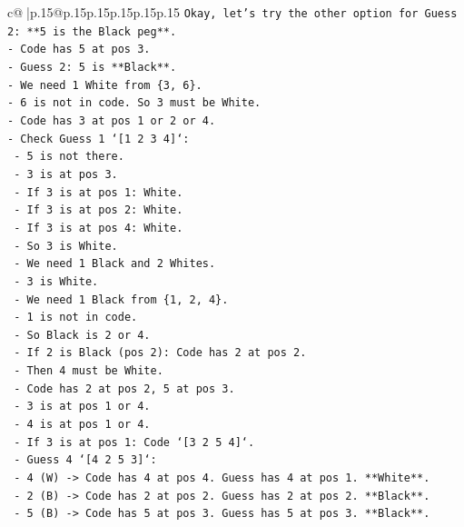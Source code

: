 \documentclass{article}
\begin{document}
{\begin{supertabular}{c@{$\;$}|p{.15\linewidth}@{}p{.15\linewidth}p{.15\linewidth}p{.15\linewidth}p{.15\linewidth}p{.15\linewidth}}
{{{\texttt{Okay, let's try the other option for Guess 2: **5 is the Black peg**.} \\
\texttt{{-}   Code has 5 at pos 3.} \\
\texttt{{-}   Guess 2: 5 is **Black**.} \\
\texttt{{-}   We need 1 White from \{3, 6\}.} \\
\texttt{{-}   6 is not in code. So 3 must be White.} \\
\texttt{{-}   Code has 3 at pos 1 or 2 or 4.} \\
\texttt{{-}   Check Guess 1 `{[}1 2 3 4{]}`:} \\
\texttt{    {-}   5 is not there.} \\
\texttt{    {-}   3 is at pos 3.} \\
\texttt{    {-}   If 3 is at pos 1: White.} \\
\texttt{    {-}   If 3 is at pos 2: White.} \\
\texttt{    {-}   If 3 is at pos 4: White.} \\
\texttt{    {-}   So 3 is White.} \\
\texttt{    {-}   We need 1 Black and 2 Whites.} \\
\texttt{    {-}   3 is White.} \\
\texttt{    {-}   We need 1 Black from \{1, 2, 4\}.} \\
\texttt{    {-}   1 is not in code.} \\
\texttt{    {-}   So Black is 2 or 4.} \\
\texttt{    {-}   If 2 is Black (pos 2): Code has 2 at pos 2.} \\
\texttt{        {-}   Then 4 must be White.} \\
\texttt{        {-}   Code has 2 at pos 2, 5 at pos 3.} \\
\texttt{        {-}   3 is at pos 1 or 4.} \\
\texttt{        {-}   4 is at pos 1 or 4.} \\
\texttt{        {-}   If 3 is at pos 1: Code `{[}3 2 5 4{]}`.} \\
\texttt{            {-}   Guess 4 `{[}4 2 5 3{]}`:} \\
\texttt{                {-}   4 (W) {-}> Code has 4 at pos 4. Guess has 4 at pos 1. **White**.} \\
\texttt{                {-}   2 (B) {-}> Code has 2 at pos 2. Guess has 2 at pos 2. **Black**.} \\
\texttt{                {-}   5 (B) {-}> Code has 5 at pos 3. Guess has 5 at pos 3. **Black**.} \\
}}}
\end{supertabular}}
\end{document}
